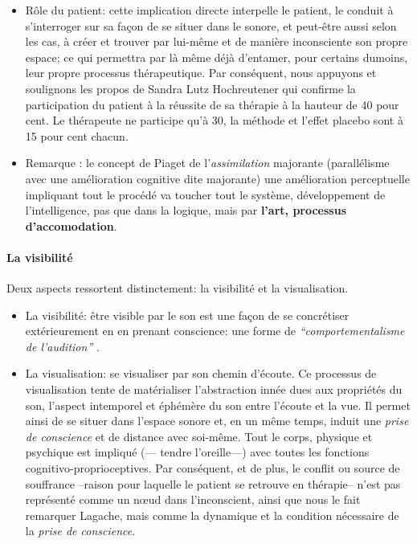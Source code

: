 \begin{itemize}
  \item Rôle du patient: cette implication directe interpelle le patient, le conduit à
    s'interroger sur sa façon de 
    se situer dans le sonore, et  peut-être aussi selon les cas, à
    créer et trouver par lui-même et de manière
 inconsciente  
 son propre espace; ce  qui permettra par là même déjà d'entamer, pour certains dumoins, leur propre
 processus thérapeutique.
 Par conséquent, nous appuyons et soulignons  les propos de Sandra Lutz
 Hochreutener qui confirme la participation du patient à la réussite de sa thérapie à la hauteur de 
 40 pour cent. Le thérapeute ne participe qu'à 30, la
 méthode et l'effet placebo sont à 15 pour cent chacun.
 
 
  \item Remarque : le concept de Piaget de l'\textit{assimilation} majorante (parallélisme avec une amélioration cognitive dite majorante)
une amélioration perceptuelle impliquant tout le procédé va toucher tout le
système, développement de l'intelligence, pas que dans la logique, mais
par \textbf{l'art, 
processus d'accomodation}.

  
\end{itemize}

\paragraph{La visibilité}

Deux aspects ressortent distinctement: la visibilité et la visualisation.
\begin{itemize}
 
\item La visibilité: être visible par le son est une façon de se concrétiser extérieurement en en prenant conscience: une forme de \textit{``comportementalisme de l'audition''} .


\item La visualisation: se visualiser par son chemin d'écoute.  
Ce processus de visualisation tente de matérialiser l'abstraction innée dues aux propriétés du son, l'aspect intemporel et éphémère du son entre l'écoute et la vue.
Il permet ainsi de se situer dans l'espace sonore et, en un même temps, induit une \textit{prise de conscience }et de distance avec soi-même. Tout le corps, physique et psychique est impliqué (--- tendre l'oreille---) avec toutes les fonctions cognitivo-proprioceptives.
Par conséquent, et de plus, le conflit ou source de souffrance --raison pour laquelle le
patient se retrouve en thérapie--  n’est pas représenté
comme un nœud dans l’inconscient, ainsi que nous le fait remarquer Lagache, mais comme la
dynamique et la condition nécessaire de la \textit{prise de
  conscience}.
\end{itemize}


